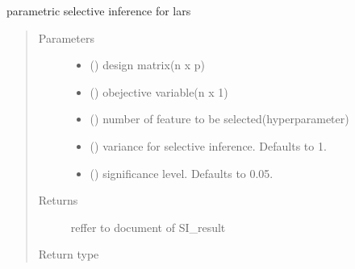 \documentclass[letterpaper,10pt,english]{sphinxmanual}
\begin{document}
\begin{fulllineitems}
\label{\detokenize{selective:selective_inference.lars_si.parametric_lars_si}}
parametric selective inference for lars
\begin{quote}\begin{description}
\item[{Parameters}] \leavevmode\begin{itemize}
\item {} 
 () \textendash{} design matrix(n x p)

\item {} 
 () \textendash{} obejective variable(n x 1)

\item {} 
 () \textendash{} number of feature to be selected(hyperparameter)

\item {} 
 (\sphinxstyleliteralemphasis{\sphinxupquote{, }}) \textendash{} variance for selective inference. Defaults to 1.

\item {} 
 (\sphinxstyleliteralemphasis{\sphinxupquote{, }}) \textendash{} significance level. Defaults to 0.05.

\end{itemize}

\item[{Returns}] \leavevmode
reffer to document of SI\_result

\item[{Return type}] \leavevmode
{\hyperref[\detokenize{selective:selective_inference.si.SI_result}]{}}

\end{description}\end{quote}

\end{fulllineitems}
\end{document}
